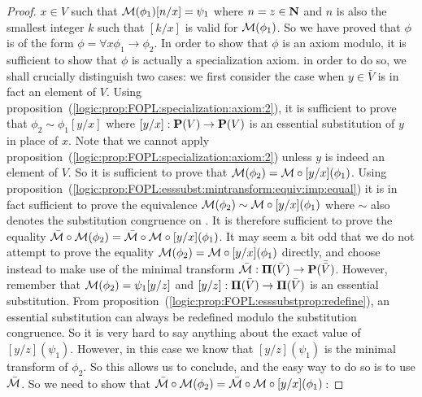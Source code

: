 \begin{proof}
$x\in V$ such that ${\cal M}(\phi_{1})[n/x]=\psi_{1}$ where
$n=z\in\mbox{$\bf N$}$ and $n$ is also the smallest integer $k$ such that
$[k/x]$ is valid for ${\cal M}(\phi_{1})$. So we have proved that
$\phi$ is of the form $\phi=\forall x\phi_{1}\to\phi_{2}$. In order
to show that $\phi$ is an axiom modulo, it is sufficient to show
that $\phi$ is actually a specialization axiom. in order to do so,
we shall crucially distinguish two cases: we first consider the case
when $y\in\bar{V}$ is in fact an element of $V$. Using
proposition~(\ref{logic:prop:FOPL:specialization:axiom:2}), it is
sufficient to prove that $\phi_{2}\sim\phi_{1}[y/x]$ where
$[y/x]:\mbox{${\bf P}(V)$}\to\mbox{${\bf P}(V)$}$ is an essential substitution of $y$ in place of
$x$. Note that we cannot apply
proposition~(\ref{logic:prop:FOPL:specialization:axiom:2}) unless
$y$ is indeed an element of $V$. So it is sufficient to prove that
${\cal M}(\phi_{2})={\cal M}\circ[y/x](\phi_{1})$. Using
proposition~(\ref{logic:prop:FOPL:esssubst:mintransform:equiv:imp:equal})
it is in fact sufficient to prove the equivalence ${\cal
M}(\phi_{2})\sim{\cal M}\circ[y/x](\phi_{1})$ where $\sim$ also
denotes the substitution congruence on \pvb. It is therefore
sufficient to prove the equality $\bar{\cal M}\circ{\cal
M}(\phi_{2})=\bar{\cal M}\circ{\cal M}\circ[y/x](\phi_{1})$. It may
seem a bit odd that we do not attempt to prove the equality ${\cal
M}(\phi_{2})={\cal M}\circ[y/x](\phi_{1})$ directly, and choose
instead to make use of the minimal transform $\bar{\cal
M}:\mbox{${\bf\Pi}(\bar{V})$}\to{\bf P}(\bar{\bar{V}})$. However, remember that ${\cal
M}(\phi_{2})=\psi_{1}[y/z]$ and $[y/z]:\mbox{${\bf\Pi}(\bar{V})$}\to\mbox{${\bf\Pi}(\bar{V})$}$ is an essential
substitution. From
proposition~(\ref{logic:prop:FOPL:esssubstprop:redefine}), an
essential substitution can always be redefined modulo the
substitution congruence. So it is very hard to say anything about
the exact value of $[y/z](\psi_{1})$. However, in this case we know
that $[y/z](\psi_{1})$ is the minimal transform of $\phi_{2}$. So
this allows us to conclude, and the easy way to do so is to use
$\bar{\cal M}$. So we need to show that $\bar{\cal M}\circ{\cal
M}(\phi_{2})=\bar{\cal M}\circ{\cal M}\circ[y/x](\phi_{1})$\,:


\end{proof}
